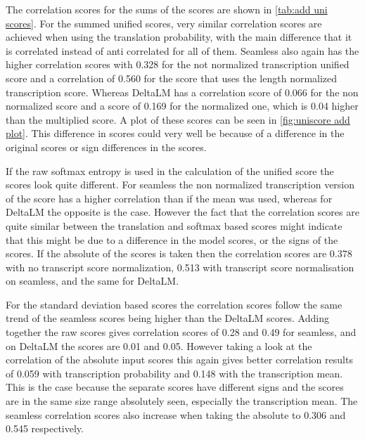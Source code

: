 The correlation scores for the sums of the scores are shown in \autoref{tab:add uni scores}.
For the summed unified scores, very similar correlation scores are achieved when using the translation probability, with the main difference that it is correlated instead of anti correlated for all of them. Seamless also again has the higher correlation scores with 0.328 for the not normalized transcription unified score and a correlation of 0.560 for the score that uses the length normalized  transcription score. Whereas DeltaLM has a correlation score of 0.066 for the non normalized score and a score of 0.169 for the normalized one, which is 0.04 higher than the multiplied score. A plot of these scores can be seen in \autoref{fig:uniscore add plot}. This difference in scores could very well be because of a difference in the original scores or sign differences in the scores. 

If the raw softmax entropy is used in the calculation of the unified score the scores look quite different. For seamless the non normalized transcription version of the score has a higher correlation than if the mean was used, whereas for DeltaLM the opposite is the case. However the fact that the correlation scores are quite similar between the translation and softmax based scores might indicate that this might be due to a difference in the model scores, or the signs of the scores. If the absolute of the scores is taken then the correlation scores are 0.378 with no transcript score normalization, 0.513 with transcript score normalisation on seamless, and the same for DeltaLM. 

For the standard deviation based scores the correlation scores follow the same trend of the seamless scores being higher than the DeltaLM scores. Adding together the raw scores gives correlation scores of 0.28 and 0.49 for seamless, and on DeltaLM the scores are 0.01 and 0.05. However taking a look at the correlation of the absolute input scores this again gives better correlation results of 0.059 with transcription probability and 0.148 with the transcription mean. This is the case because the separate scores have different signs and the scores are in the same size range absolutely seen, especially the transcription mean. The seamless correlation scores also increase when taking the absolute to 0.306 and 0.545 respectively. 

